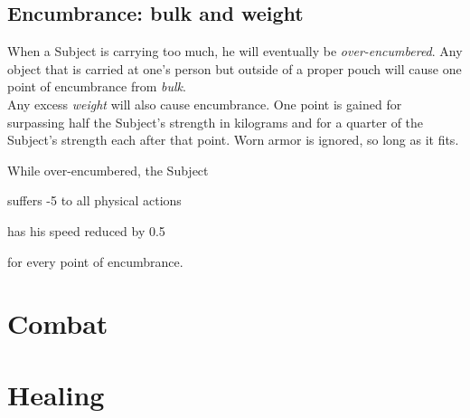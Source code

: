 \documentclass[11pt,a4paper,openany,dvipsnames]{book}
\begin{document}
	\section{Encumbrance: bulk and weight}
	When a Subject is carrying too much,
		he will eventually be \emph{over-encumbered}.
	Any object that is carried at one's person
		but outside of a proper pouch will cause one point of encumbrance from \emph{bulk}.
	\\%
	Any excess \emph{weight} will also cause encumbrance.
	One point is gained for surpassing half the Subject’s strength in kilograms
		and for a quarter of the Subject’s strength each after that point.
	Worn armor is ignored, so long as it fits.
	\par
	While over-encumbered, the Subject
	\begin{sitemize}
		\item suffers -5 to all physical actions
		\item has his speed reduced by 0.5
	\end{sitemize}
	\vspace{-10mm}
	for every point of encumbrance.

	\chapter{Combat}
	\label{ch:combat}
	
	
	
	

	\chapter{Healing}
	\vspace{-10mm} %
\end{document}
